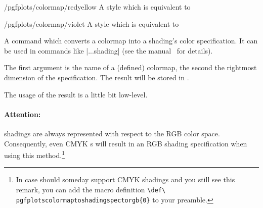 \begin{stylekey}{/pgfplots/colormap/redyellow}
    A style which is equivalent to
\begin{codeexample}
\end{codeexample}

\end{stylekey}

\begin{stylekey}{/pgfplots/colormap/violet}
    A style which is equivalent to
\begin{codeexample}
\end{codeexample}

\end{stylekey}

\begin{command}{\pgfplotscolormaptoshadingspec{}}
    A command which converts a colormap into a \PGF{} shading's color
    specification. It can be used in commands like |\pgfdeclare...shading| (see
    the \PGF{} manual~\cite{tikz} for details).

    The first argument is the name of a (defined) colormap, the second the
    rightmost dimension of the specification. The result will be stored in
    .
\begin{codeexample}[]
    \result
    \def\tempb{\pgfdeclarehorizontalshading{tempshading}{1cm}}%
    \expandafter\tempb\expandafter{\result}%
\end{codeexample}
    The usage of the result  is a little bit
    low-level.


    \paragraph{Attention:}

    \PGF{} shadings are always represented with respect to the RGB color space.
    Consequently, even CMYK s will result in an RGB shading
    specification when using this method.\footnote{In case \PGF{} should someday
    support CMYK shadings and you still see this remark, you can add the macro
    definition \texttt{\textbackslash def\textbackslash
    pgfplotscolormaptoshadingspectorgb\{0\}} to your preamble.}
\end{command}

